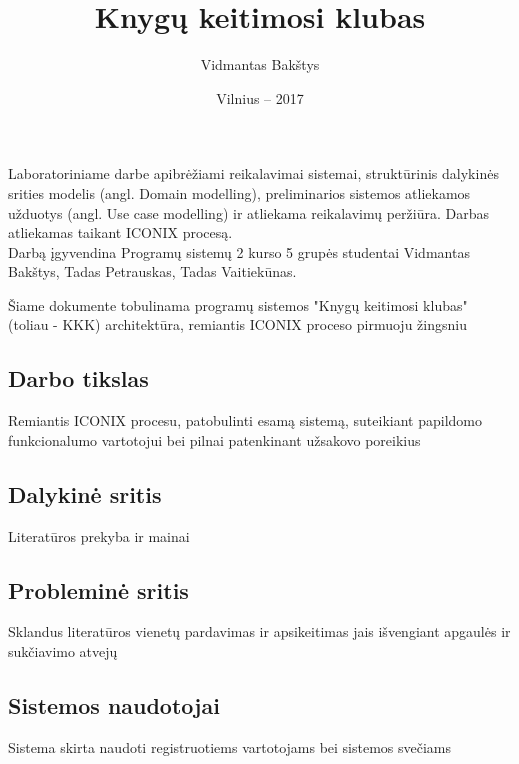 \documentclass{VUMIFPSkursinis}
\title{Knygų keitimosi klubas}
\author{Vidmantas Bakštys}
\date{Vilnius – 2017}
\begin{document}
\maketitle

\setcounter{tocdepth}{2}

\tableofcontents
{} 

\setcounter{secnumdepth}{0}

Laboratoriniame darbe apibrėžiami reikalavimai sistemai, struktūrinis dalykinės srities modelis (angl. Domain modelling), preliminarios sistemos atliekamos užduotys (angl. Use case modelling) ir atliekama reikalavimų peržiūra. Darbas atliekamas taikant ICONIX procesą.\\
Darbą įgyvendina Programų sistemų 2 kurso 5 grupės studentai Vidmantas Bakštys, Tadas Petrauskas, Tadas Vaitiekūnas.

Šiame dokumente tobulinama programų sistemos "Knygų keitimosi klubas" (toliau - KKK) architektūra, remiantis ICONIX proceso pirmuoju žingsniu

\subsection{Darbo tikslas}
Remiantis ICONIX procesu, patobulinti esamą sistemą, suteikiant papildomo funkcionalumo vartotojui bei pilnai patenkinant užsakovo poreikius

\subsection{Dalykinė sritis}
Literatūros prekyba ir mainai

\subsection{Probleminė sritis}
Sklandus literatūros vienetų pardavimas ir apsikeitimas jais išvengiant apgaulės ir sukčiavimo atvejų

\subsection{Sistemos naudotojai}
Sistema skirta naudoti registruotiems vartotojams bei sistemos svečiams

%
\setcounter{secnumdepth}{4}
\end{document}

